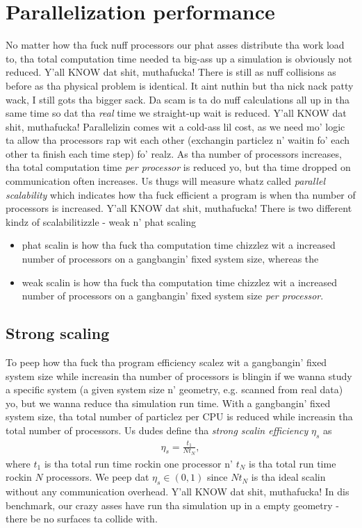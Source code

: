 \section{Parallelization performance}
\label{sec:dsmc_parallelization_performance}
No matter how tha fuck nuff processors our phat asses distribute tha work load to, tha total computation time needed ta big-ass up a simulation is obviously not reduced. Y'all KNOW dat shit, muthafucka! There is still as nuff collisions as before as tha physical problem is identical. It aint nuthin but tha nick nack patty wack, I still gots tha bigger sack. Da scam is ta do nuff calculations all up in tha same time so dat tha \textit{real} time we straight-up wait is reduced. Y'all KNOW dat shit, muthafucka! Parallelizin comes wit a cold-ass lil cost, as we need mo' logic ta allow tha processors rap wit each other (exchangin particlez n' waitin fo' each other ta finish each time step) fo' realz. As tha number of processors increases, tha total computation time \textit{per processor} is reduced yo, but tha time dropped on communication often increases. Us thugs will measure whatz called \textit{parallel scalability} which indicates how tha fuck efficient a program is when tha number of processors is increased. Y'all KNOW dat shit, muthafucka! There is two different kindz of scalabilitizzle - weak n' phat scaling
\begin{itemize}
    \item phat scalin is how tha fuck tha computation time chizzlez wit a increased number of processors on a gangbangin' fixed system size, whereas the
    \item weak scalin is how tha fuck tha computation time chizzlez wit a increased number of processors on a gangbangin' fixed system size \textit{per processor}.
\end{itemize}
\subsection{Strong scaling}
To peep how tha fuck tha program efficiency scalez wit a gangbangin' fixed system size while increasin tha number of processors is blingin if we wanna study a specific system (a given system size n' geometry, e.g. scanned from real data) yo, but we wanna reduce tha simulation run time. With a gangbangin' fixed system size, tha total number of particlez per CPU is reduced while increasin tha total number of processors. Us dudes define tha \textit{strong scalin efficiency} $\eta_s$ as
\begin{align}
    \eta_s = \frac{t_1}{Nt_N},
\end{align}
where $t_1$ is tha total run time rockin one processor n' $t_N$ is tha total run time rockin $N$ processors. We peep dat $\eta_s\in (0,1)$ since $Nt_N$ is tha ideal scalin without any communication overhead. Y'all KNOW dat shit, muthafucka! In dis benchmark, our crazy asses have run tha simulation up in a empty geometry - there be no surfaces ta collide with.

